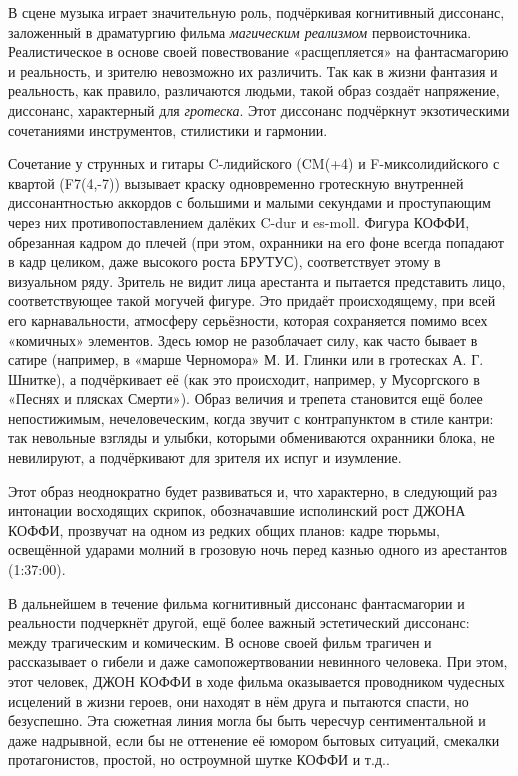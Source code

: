 В сцене музыка играет значительную роль, подчёркивая когнитивный диссонанс, заложенный в драматургию фильма \emph{магическим реализмом} первоисточника.
Реалистическое в основе своей повествование «расщепляется» на фантасмагорию и реальность, и зрителю невозможно их различить.
Так как в жизни фантазия и реальность, как правило, различаются людьми, такой образ создаёт напряжение, диссонанс, характерный для \emph{гротеска}.
Этот диссонанс подчёркнут экзотическими сочетаниями инструментов, стилистики и гармонии.

Сочетание у струнных и гитары C-лидийского (CM(+4) и F-миксолидийского с квартой (F7(4,-7)) вызывает краску одновременно гротескную внутренней диссонантностью аккордов с большими и малыми секундами и проступающим через них противопоставлением далёких C-dur и es-moll.
Фигура КОФФИ, обрезанная кадром до плечей (при этом, охранники на его фоне всегда попадают в кадр целиком, даже высокого роста БРУТУС), соответствует этому в визуальном ряду.
Зритель не видит лица арестанта и пытается представить лицо, соответствующее такой могучей фигуре.
Это придаёт происходящему, при всей его карнавальности, атмосферу серьёзности, которая сохраняется помимо всех «комичных» элементов.
Здесь юмор не разоблачает силу, как часто бывает в сатире (например, в «марше Черномора» М. И. Глинки или в гротесках А. Г. Шнитке), а подчёркивает её (как это происходит, например, у Мусоргского в «Песнях и плясках Смерти»).
Образ величия и трепета становится ещё более непостижимым, нечеловеческим, когда звучит с контрапунктом в стиле кантри: так невольные взгляды и улыбки, которыми обмениваются охранники блока, не невилируют, а подчёркивают для зрителя их испуг и изумление.

Этот образ неоднократно будет развиваться и, что характерно, в следующий раз интонации восходящих скрипок, обозначавшие исполинский рост ДЖОНА КОФФИ, прозвучат на одном из редких общих планов: кадре тюрьмы, освещённой ударами молний в грозовую ночь перед казнью одного из арестантов (1:37:00).

В дальнейшем в течение фильма когнитивный диссонанс фантасмагории и реальности подчеркнёт другой, ещё более важный эстетический диссонанс: между трагическим и комическим.
В основе своей фильм трагичен и рассказывает о гибели и даже самопожертвовании невинного человека.
При этом, этот человек, ДЖОН КОФФИ в ходе фильма оказывается проводником чудесных исцелений в жизни героев, они находят в нём друга и пытаются спасти, но безуспешно.
Эта сюжетная линия могла бы быть чересчур сентиментальной и даже надрывной, если бы не оттенение её юмором бытовых ситуаций, смекалки протагонистов, простой, но остроумной шутке КОФФИ и т.д..

